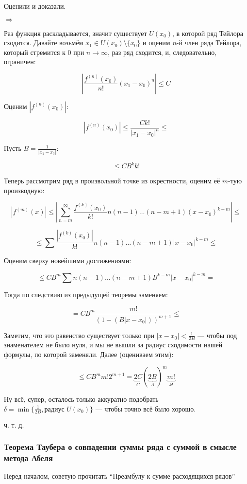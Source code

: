 \documentclass{article}
\begin{document}
Оценили и доказали.

\textbf{$\Rightarrow$}

Раз функция раскладывается, значит существует $U(x_0)$, в которой ряд Тейлора сходится. Давайте возьмём $x_1 \in U(x_0) \setminus \{x_0\}$ и оценим $n$-й член ряда Тейлора, который стремится к 0 при $n \rightarrow \infty$, раз ряд сходится, и, следовательно, ограничен: 

\[\left|\frac{f^{(n)}(x_0)}{n!}(x_1 - x_0)^n\right| \le C\]

Оценим $|f^{(n)}(x_0)|$:

\[\left|f^{(n)}(x_0)\right| \le \frac{C k!}{|x_1 - x_0|^n} \le\]

Пусть $B = \frac{1}{|x_1 - x_0|}$:

\[\le CB^kk!\]

Теперь рассмотрим ряд в произвольной точке из окрестности, оценим её $m$-тую производную:

\[\left|f^{(m)}(x)\right| \le \left|\sum_{n = m}^{\infty}\frac{f^{(k)}(x_0)}{k!}n(n - 1)\ldots(n - m + 1)(x - x_0)^{k - m}\right| \le \]

\[\le \sum \frac{\left|f^{(k)}(x_0)\right|}{k!}n(n - 1)\ldots(n - m + 1)|x - x_0|^{k - m} \le\]

Оценим сверху новейшими достижениями: 

\[\le CB^m\sum n(n - 1)\ldots(n - m + 1)B^{k - m}|x - x_0|^{k - m} = \]

Тогда по следствию из предыдущей теоремы заменяем: 

\[ = CB^m\frac{m!}{(1 - (B|x - x_0|))^{m + 1}} \le\]

Заметим, что это равенство существует только при $|x - x_0| < \frac{1}{2B}$ --- чтобы под знаменателем не было нуля, и мы не вышли за радиус сходимости нашей формулы, по которой заменяли. Далее (оцениваем этим): 

\[\le CB^mm!2^{m + 1} = \underbrace{2C}_{C}(\underbrace{2B}_{A})^m\underbrace{m!}_{k!}\]

Ну всё, супер, осталось только аккуратно подобрать $\delta = \min\{\frac{1}{2B}, \text{радиус } U(x_0)\}$ --- чтобы точно всё было хорошо.

ч. т. д. 

\subsubsection{Теорема Таубера о совпадении суммы ряда с суммой в смысле метода Абеля}

Перед началом, советую прочитать ``Преамбулу к сумме расходящихся рядов''
\end{document}
